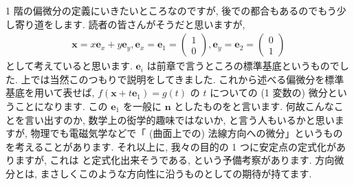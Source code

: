 \documentclass[openany, a4paper, oneside]{jsbook}
\theoremstyle{break}
\theoremstyle{breakdefn}
\begin{document}
1 階の偏微分の定義にいきたいところなのですが, 後での都合もあるのでもう少し寄り道をします.
読者の皆さんがそうだと思いますが,
\begin{align}
 \bm{x}=x \bm{e}_x + y \bm{e}_y,
 \bm{e}_x=\bm{e}_1=\begin{pmatrix}1\\0\end{pmatrix},
 \bm{e}_y=\bm{e}_2=\begin{pmatrix}0\\1\end{pmatrix}
\end{align}
 として考えていると思います.
$\bm{e}_i$ は前章で言うところの標準基底というものでした.
上では当然このつもりで説明をしてきました.
これから述べる偏微分を標準基底を用いて表せば,
$f (\bm{x}+t\bm{e}_1)=g (t)$ の $t$ についての (1 変数の) 微分ということになります.
この $\bm{e}_1$ を一般に $\bm{n}$ としたものをと言います.
何故こんなことを言い出すのか, 数学上の衒学的趣味ではないか, と言う人もいるかと思いますが,
物理でも電磁気学などで「 (曲面上での) 法線方向への微分」というものを考えることがあります.
それ以上に, 我々の目的の 1 つに安定点の定式化がありますが, これは
と定式化出来そうである, という予備考察があります.
方向微分とは, まさしくこのような方向性に沿うものとしての期待が持てます.
\end{document}
